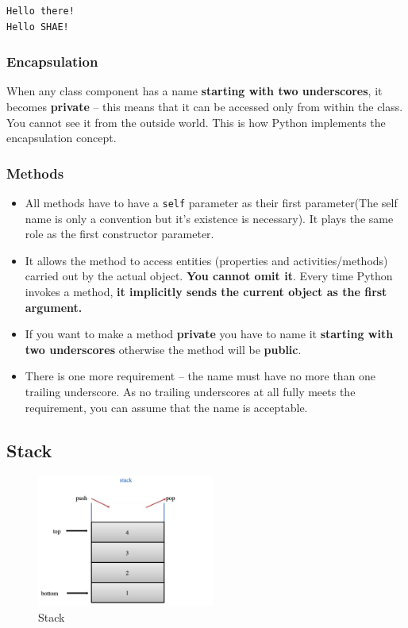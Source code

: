 \documentclass[11pt]{article}
\begin{document}
\begin{verbatim}
Hello there!
Hello SHAE!
\end{verbatim}

\subsubsection{Encapsulation}
\label{sec:orgcadae7a}
When any class component has a name \textbf{starting with two underscores},
it becomes \textbf{private} – this means that it can be accessed only from
within the class. You cannot see it from the outside world. This is
how Python implements the encapsulation concept.

\subsubsection{Methods}
\label{sec:org4d7ec9c}
\begin{itemize}
\item All methods have to have a \texttt{self} parameter as their first
parameter(The self name is only a convention but it's existence is
necessary). It plays the same role as the first constructor parameter.
\item It allows the method to access entities (properties and
activities/methods) carried out by the actual object. \textbf{You cannot
omit it}. Every time Python invokes a method, \textbf{it implicitly sends the
current object as the first argument.}
\item If you want to make a method \textbf{private} you have to name it \textbf{starting
with two underscores} otherwise the method will be \textbf{public}.
\item There is one more requirement – the name must have no more than one
trailing underscore. As no trailing underscores at all fully meets
the requirement, you can assume that the name is acceptable.
\end{itemize}

\newpage
\subsection{Stack}
\label{sec:org73a68bb}

\begin{figure}[htbp]
\centering
\includegraphics[width=220px]{./images/stack.png}
\caption{Stack}
\end{figure}
\end{document}
